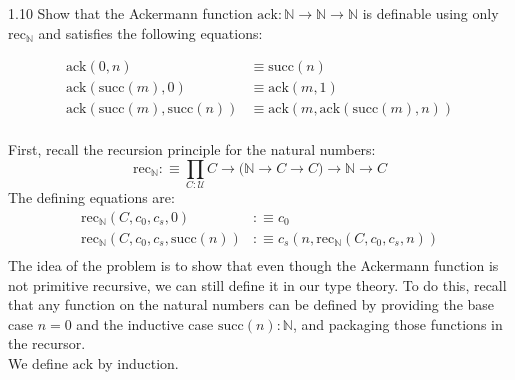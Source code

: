 \documentclass[14pt]{extarticle}
\newcommand{\N}{{\mathbb N}}
\newcommand{\0}{{\mathbf 0}}
\newcommand{\1}{{\mathbf 1}}
\newcommand{\2}{{\mathbf 2}}
\newcommand{\UU}{{\mathcal U}}
\newcommand{\rec}{\mathrm{rec}}
\newcommand{\su}{\mathrm{succ}}
\begin{document}
\begin{prob}{1.10}{}
Show that the Ackermann function $\text{ack}: \N \to \N \to \N$ is definable using only $\rec_\N$ and satisfies the following equations:

\begin{align*}
\text{ack}(0,n) &\equiv \su(n) \\
\text{ack}(\su(m),0) &\equiv \text{ack}(m,1) \\
\text{ack}(\su(m),\su(n)) &\equiv \text{ack}(m,\text{ack}(\su(m),n)) \\
\end{align*}

\end{prob}
First, recall the recursion principle for the natural numbers:
\[\rec_{\N} :\equiv \prod_{C:\UU} C \to \Big(\N \to C \to C\Big)\to \N \to C\] The defining equations are:
\begin{align*}
\rec_{\N}(C,c_0,c_s,0) &:\equiv c_0 \\
\rec_{\N}(C,c_0,c_s,\su(n)) &:\equiv c_s(n,\rec_{\N}(C,c_0,c_s,n)) \\
\end{align*}
The idea of the problem is to show that even though the Ackermann function is not primitive recursive, we can still define it in our type theory. To do this, recall that any function on the natural numbers can be defined by providing the base case $n = 0$ and the inductive case $\su(n) : \N$, and packaging those functions in the recursor.\\
We define $\text{ack}$ by induction.
\end{document}
